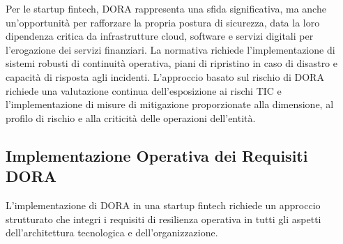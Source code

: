 Per le startup fintech, DORA rappresenta una sfida significativa, ma anche un'opportunità per rafforzare la propria postura di sicurezza, data la loro dipendenza critica da infrastrutture cloud, software e servizi digitali per l'erogazione dei servizi finanziari. La normativa richiede l'implementazione di sistemi robusti di continuità operativa, piani di ripristino in caso di disastro e capacità di risposta agli incidenti. L'approccio basato sul rischio di DORA richiede una valutazione continua dell'esposizione ai rischi TIC e l'implementazione di misure di mitigazione proporzionate alla dimensione, al profilo di rischio e alla criticità delle operazioni dell'entità.

\subsection{Implementazione Operativa dei Requisiti DORA}
L'implementazione di DORA in una startup fintech richiede un approccio strutturato che integri i requisiti di resilienza operativa in tutti gli aspetti dell'architettura tecnologica e dell'organizzazione.
